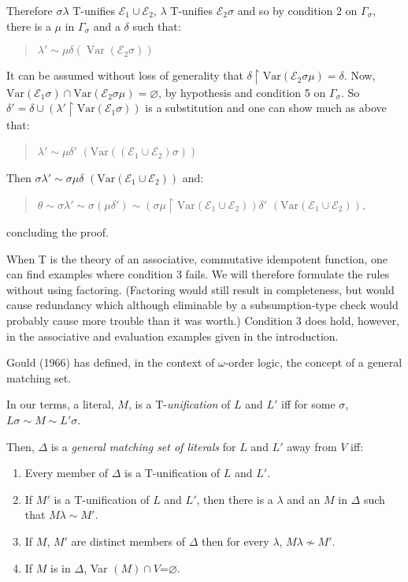\documentclass[letterpaper]{report}
\begin{document}
Therefore $\sigma\lambda$ $\mathrm{T}$-unifies $\mathcal{E}_{1}\cup\mathcal{E}_{2}$, $\lambda$ $\mathrm{T}$-unifies $\mathcal{E}_{2}\sigma$ and so by condition 2 on $\Gamma_{\sigma}$, there is a $\mu$ in $\Gamma_{\sigma}$ and a $\delta$ such that:
\begin{quote}
$\lambda'\sim\mu\delta(\operatorname{Var}(\mathcal{E}_{2}\sigma))$
\end{quote}

It can be assumed without loss of generality that $\delta\upharpoonright\mathrm{Var}(\mathcal{E}_{2}\sigma\mu)=\delta$. Now, $\mathrm{Var}(\mathcal{E}_{1}\sigma)\cap\mathrm{Var}(\mathcal{E}_{2}\sigma\mu) =\varnothing$, by hypothesis and condition 5 on $\Gamma_{\sigma}$. So $\delta'=\delta\cup(\lambda'\upharpoonright\mathrm{Var}( \mathcal{E}_{1}\sigma))$ is a substitution and one can show much as above that:
\begin{quote}
$\lambda'\sim\mu\delta'$ \quad$(\mathrm{Var}((\mathcal{E}_{1}\cup\mathcal{E}_{2})\sigma))$
\end{quote}
Then $\sigma\lambda'\sim\sigma\mu\delta$ \quad $(\mathrm{Var}(\mathcal{E}_{1}\cup\mathcal{E}_{2}))$ and:

\begin{quote}
$\theta \sim \sigma\lambda' \sim \sigma(\mu \delta') \sim (\sigma\mu\upharpoonright\mathrm{Var}(\mathcal{E}_{ 1}\cup\mathcal{E}_{2}))\delta'$   \quad$(\mathrm{Var}(\mathcal{E}_{1}\cup \mathcal{E}_{2}))$,
\end{quote}
concluding the proof.

When T is the theory of an associative, commutative idempotent function,
one can find examples where condition 3 fails. We will therefore
formulate the rules without using factoring. (Factoring would still
result in completeness, but would cause redundancy which although
eliminable by a subsumption-type check would probably cause more trouble
than it was worth.) Condition 3 does hold, however, in the associative
and evaluation examples given in the introduction.

Gould (1966) has defined, in the context of $\omega$-order logic, the
concept of a general matching set.

In our terms, a literal, $M$, is a $\mathrm{T}$-\emph{unification} of $L$ and
$L'$ iff for some $\sigma$,
$L\sigma\sim M\sim L'\sigma$.

Then, $\Delta$ is a \emph{general matching set of literals} for $L$
and $L'$ away from $V$ iff:

\begin{enumerate}
	\def\labelenumi{(\arabic{enumi})}
	\item
	Every member of $\Delta$ is a $\mathrm{T}$-unification of $L$
	and $L'$.
	\item
	If $M'$ is a $\mathrm{T}$-unification of $L$ and
	$L'$, then there is a $\lambda$ and an $M$ in $\Delta$
	such that $M\lambda\sim M'$.
	\item
	If $M$, $M'$ are distinct members of $\Delta$ then for
	every $\lambda$, $M\lambda\nsim M'$.
	\item
	If $M$ is in $\Delta$, Var $(M)\cap V$=$\varnothing$.
\end{enumerate}
\end{document}
